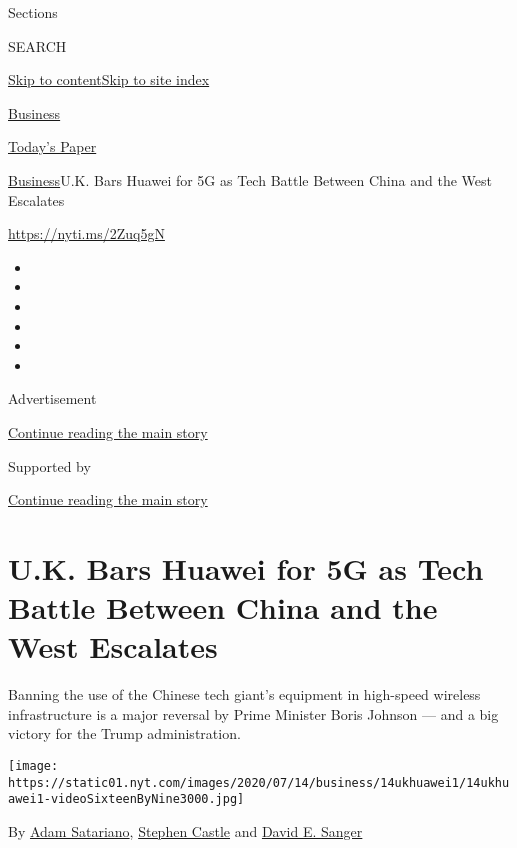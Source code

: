 Sections

SEARCH

\protect\hyperlink{site-content}{Skip to
content}\protect\hyperlink{site-index}{Skip to site index}

\href{https://www.nytimes.com/section/business}{Business}

\href{https://myaccount.nytimes.com/auth/login?response_type=cookie\&client_id=vi}{}

\href{https://www.nytimes.com/section/todayspaper}{Today's Paper}

\href{/section/business}{Business}\textbar{}U.K. Bars Huawei for 5G as
Tech Battle Between China and the West Escalates

\url{https://nyti.ms/2Zuq5gN}

\begin{itemize}
\item
\item
\item
\item
\item
\item
\end{itemize}

Advertisement

\protect\hyperlink{after-top}{Continue reading the main story}

Supported by

\protect\hyperlink{after-sponsor}{Continue reading the main story}

\hypertarget{uk-bars-huawei-for-5g-as-tech-battle-between-china-and-the-west-escalates}{%
\section{U.K. Bars Huawei for 5G as Tech Battle Between China and the
West
Escalates}\label{uk-bars-huawei-for-5g-as-tech-battle-between-china-and-the-west-escalates}}

Banning the use of the Chinese tech giant's equipment in high-speed
wireless infrastructure is a major reversal by Prime Minister Boris
Johnson --- and a big victory for the Trump administration.

\texttt{[image: https://static01.nyt.com/images/2020/07/14/business/14ukhuawei1/14ukhuawei1-videoSixteenByNine3000.jpg]}

By \href{https://www.nytimes.com/by/adam-satariano}{Adam Satariano},
\href{https://www.nytimes.com/by/stephen-castle}{Stephen Castle} and
\href{https://www.nytimes.com/by/david-e-sanger}{David E. Sanger}


